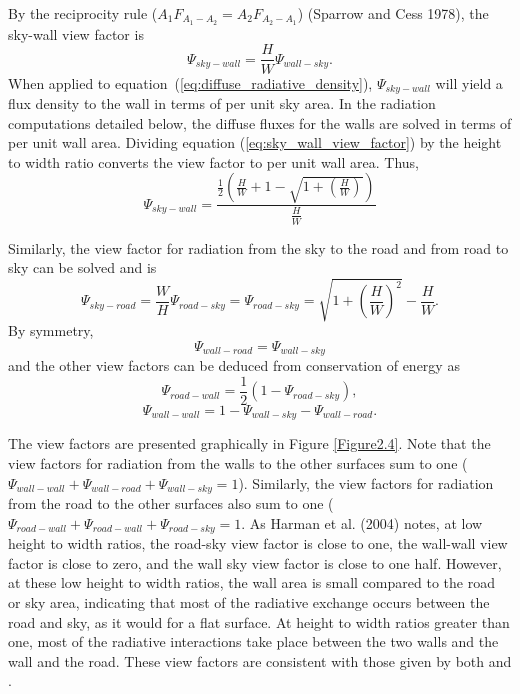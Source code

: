 \documentclass[12pt,authoryear]{elsarticle}
\numberwithin{equation}{section} %
\begin{document}
By the reciprocity rule ($A_{1}F_{A_{1}-A_{2}}=A_{2}F_{A_{2}-A_{1}}$) (Sparrow and Cess 1978), the sky-wall view factor is
\begin{equation}
\label{eq:sky_wall_view_factor}
\Psi_{sky-wall} = \frac{H}{W}\Psi_{wall-sky}.
\end{equation}
When applied to equation~(\ref{eq:diffuse_radiative_density}), $\Psi_{sky-wall}$ will yield a flux density to the wall in terms of per unit sky area. In the radiation computations detailed below, the diffuse fluxes for the walls are solved in terms of per unit wall area. Dividing equation (\ref{eq:sky_wall_view_factor}) by the height to width ratio converts the view factor to per unit wall area. Thus,
\begin{equation}
\Psi_{sky-wall} = \frac{\frac{1}{2}\left(\frac{H}{W}+1-\sqrt{1+\left(\frac{H}{W}\right)}\right)}{\frac{H}{W}}
\end{equation}

Similarly, the view factor for radiation from the sky to the road and from road to sky can be solved and is
\begin{equation}
\label{eq:sky_road_view_factor}
\Psi_{sky-road}=\frac{W}{H}\Psi_{road-sky}=\Psi_{road-sky}=\sqrt{1+(\frac{H}{W})^2}-\frac{H}{W}.
\end{equation}
By symmetry,
\begin{equation}
\Psi_{wall-road}=\Psi_{wall-sky}
\end{equation}
and the other view factors can be deduced from conservation of energy as
\begin{equation}
\Psi_{road-wall} = \frac{1}{2}(1-\Psi_{road-sky}),
\end{equation}
\begin{equation}
\Psi_{wall-wall}=1-\Psi_{wall-sky}-\Psi_{wall-road}.
\end{equation}

The view factors are presented graphically in Figure \ref{Figure2.4}. Note that the view factors for radiation from the walls to the other surfaces sum to one ($\Psi_{wall-wall}+\Psi_{wall-road}+\Psi_{wall-sky}=1$). Similarly, the view factors for radiation from the road to the other surfaces also sum to one ($\Psi_{road-wall}+\Psi_{road-wall}+\Psi_{road-sky}=1$. As Harman et al. (2004) notes, at low height to width ratios, the road-sky view factor is close to one, the wall-wall view factor is close to zero, and the wall sky view factor is close to one half. However, at these low height to width ratios, the wall area is small compared to the road or sky area, indicating that most of the radiative exchange occurs between the road and sky, as it would for a flat surface. At height to width ratios greater than one, most of the radiative interactions take place between the two walls and the wall and the road. These view factors are consistent with those given by both \citet{massonPhysicallyBasedSchemeUrban2000} and \citet{harmanRadiativeExchangeUrban2004}.
\end{document}
